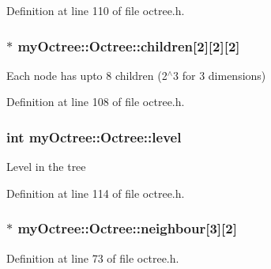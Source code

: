 Definition at line 110 of file octree.\+h.

\hypertarget{classmy_octree_1_1_octree_a2600c7d4ed026f4566412ba67feba623}{}
\subsubsection[{children}]{$\ast$ my\+Octree\+::\+Octree\+::children\mbox{[}2\mbox{]}\mbox{[}2\mbox{]}\mbox{[}2\mbox{]}\hspace{0.3cm}{\ttfamily [private]}}\label{classmy_octree_1_1_octree_a2600c7d4ed026f4566412ba67feba623}
Each node has upto 8 children (2$^\wedge$3 for 3 dimensions) 

Definition at line 108 of file octree.\+h.

\hypertarget{classmy_octree_1_1_octree_a4f032a94e51ee90c4d97a3acfea9419d}{}
\subsubsection[{level}]{\setlength{\rightskip}{0pt plus 5cm}int my\+Octree\+::\+Octree\+::level\hspace{0.3cm}{\ttfamily [private]}}\label{classmy_octree_1_1_octree_a4f032a94e51ee90c4d97a3acfea9419d}
Level in the tree 

Definition at line 114 of file octree.\+h.

\hypertarget{classmy_octree_1_1_octree_a667ca17260eb69985476f64fe877b626}{}
\subsubsection[{neighbour}]{$\ast$ my\+Octree\+::\+Octree\+::neighbour\mbox{[}3\mbox{]}\mbox{[}2\mbox{]}}\label{classmy_octree_1_1_octree_a667ca17260eb69985476f64fe877b626}


Definition at line 73 of file octree.\+h.

\hypertarget{classmy_octree_1_1_octree_a86d3fb8b805509bc5522b8b470d2c682}{}
